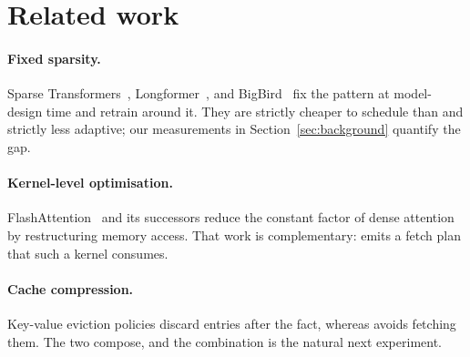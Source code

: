 \section{Related work}
\label{sec:related}

\paragraph{Fixed sparsity.}
Sparse Transformers~\cite{child2019sparse}, Longformer~\cite{beltagy2020longformer},
and BigBird~\cite{zaheer2020bigbird} fix the pattern at model-design time and
retrain around it. They are strictly cheaper to schedule than \sysname{} and
strictly less adaptive; our measurements in Section~\ref{sec:background}
quantify the gap.

\paragraph{Kernel-level optimisation.}
FlashAttention~\cite{dao2022flashattention} and its successors reduce the
constant factor of dense attention by restructuring memory access. That work is
complementary: \sysname{} emits a fetch plan that such a kernel consumes.

\paragraph{Cache compression.}
Key-value eviction policies discard entries after the fact, whereas \sysname{}
avoids fetching them. The two compose, and the combination is the natural next
experiment.
